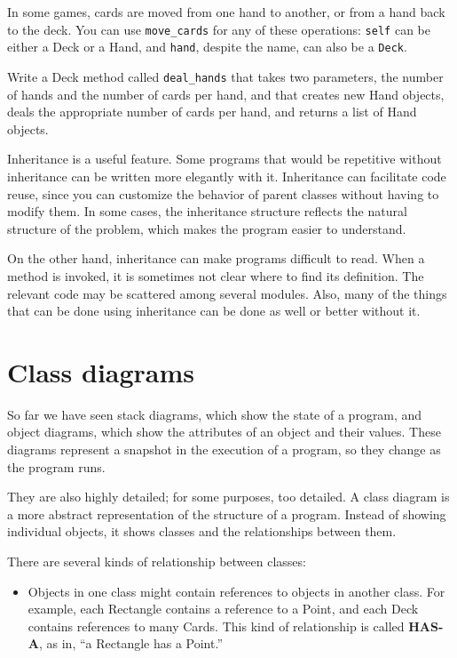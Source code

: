 \documentclass[10pt]{book}
\begin{document}
\begin{CJK}{UTF8}{gbsn}
In some games, cards are moved from one hand to another,
or from a hand back to the deck.  You can use \verb"move_cards"
for any of these operations: {\tt self} can be either a Deck
or a Hand, and {\tt hand}, despite the name, can also be a {\tt Deck}.

\begin{exercise}

Write a Deck method called \verb"deal_hands" that takes two
parameters, the number of hands and the number of cards per
hand, and that creates new Hand objects, deals the appropriate
number of cards per hand, and returns a list of Hand objects.

\end{exercise}

Inheritance is a useful feature.  Some programs that would be
repetitive without inheritance can be written more elegantly
with it.  Inheritance can facilitate code reuse, since you can
customize the behavior of parent classes without having to modify
them.  In some cases, the inheritance structure reflects the natural
structure of the problem, which makes the program easier to
understand.

On the other hand, inheritance can make programs difficult to read.
When a method is invoked, it is sometimes not clear where to find its
definition.  The relevant code may be scattered among several modules.
Also, many of the things that can be done using inheritance can be
done as well or better without it.  


\section{Class diagrams}
\label{class.diagram}

So far we have seen stack diagrams, which show the state of
a program, and object diagrams, which show the attributes
of an object and their values.  These diagrams represent a snapshot
in the execution of a program, so they change as the program
runs.

They are also highly detailed; for some purposes, too
detailed.  A class diagram is a more abstract representation
of the structure of a program.  Instead of showing individual
objects, it shows classes and the relationships between them.

There are several kinds of relationship between classes:

\begin{itemize}

\item Objects in one class might contain references to objects
in another class.  For example, each Rectangle contains a reference
to a Point, and each Deck contains references to many Cards.
This kind of relationship is called {\bf HAS-A}, as in, ``a Rectangle
has a Point.''


\end{itemize}
\end{CJK}
\end{document}
